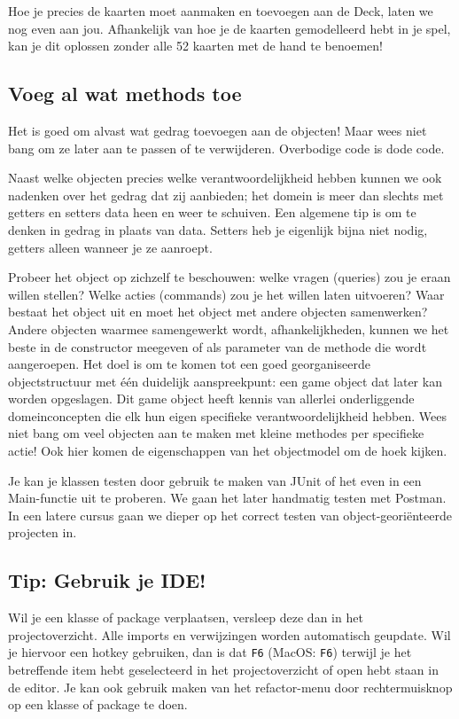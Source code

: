 Hoe je precies de kaarten moet aanmaken en toevoegen aan de Deck,
laten we nog even aan jou. Afhankelijk van hoe je de kaarten gemodelleerd hebt 
in je spel, kan je dit oplossen zonder alle 52 kaarten met de hand te benoemen!

\subsection{Voeg al wat methods toe}
Het is goed om alvast wat gedrag toevoegen aan de objecten!
Maar wees niet bang om ze later aan te passen of te verwijderen.
Overbodige code is dode code.

Naast welke objecten precies welke verantwoordelijkheid hebben 
kunnen we ook nadenken over het gedrag dat zij aanbieden; 
het domein is meer dan slechts met getters en setters data heen en weer te schuiven. 
Een algemene tip is om te denken in gedrag in plaats van data. 
Setters heb je eigenlijk bijna niet nodig, getters alleen wanneer je ze aanroept. 

Probeer het object op zichzelf te beschouwen: welke vragen (queries) zou je eraan willen stellen? 
Welke acties (commands) zou je het willen laten uitvoeren? 
Waar bestaat het object uit en moet het object met andere objecten samenwerken? 
Andere objecten waarmee samengewerkt wordt, afhankelijkheden, 
kunnen we het beste in de constructor meegeven of als parameter van de methode die wordt aangeroepen. 
Het doel is om te komen tot een goed georganiseerde objectstructuur met één duidelijk aanspreekpunt: 
een game object dat later kan worden opgeslagen. 
Dit game object heeft kennis van allerlei onderliggende domeinconcepten 
die elk hun eigen specifieke verantwoordelijkheid hebben. 
Wees niet bang om veel objecten aan te maken met kleine methodes per specifieke actie! 
Ook hier komen de eigenschappen van het objectmodel om de hoek kijken.

Je kan je klassen testen door gebruik te maken van JUnit of het even 
in een Main-functie uit te proberen. We gaan het later handmatig testen met 
Postman. In een latere cursus gaan we dieper op het correct testen van object-georiënteerde projecten in.

\subsection{Tip: Gebruik je IDE!}
Wil je een klasse of package verplaatsen, versleep deze dan in het projectoverzicht.
Alle imports en verwijzingen worden automatisch geupdate. Wil je hiervoor een hotkey gebruiken,
dan is dat \texttt{F6} (MacOS: \texttt{F6}) terwijl je het betreffende item hebt geselecteerd 
in het projectoverzicht of open hebt staan in de editor. Je kan ook gebruik maken van 
het refactor-menu door rechtermuisknop op een klasse of package te doen.

